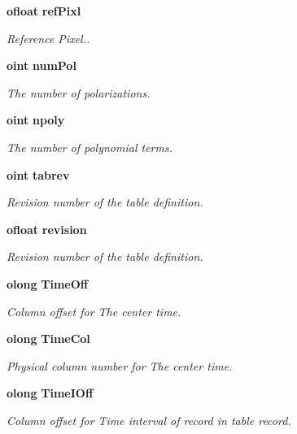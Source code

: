 \begin{CompactItemize}
{\bf ofloat} {\bf ref\-Pixl}
\begin{CompactList}\small\item\em Reference Pixel.. \item\end{CompactList}\item 
{\bf oint} {\bf num\-Pol}
\begin{CompactList}\small\item\em The number of polarizations. \item\end{CompactList}\item 
{\bf oint} {\bf npoly}
\begin{CompactList}\small\item\em The number of polynomial terms. \item\end{CompactList}\item 
{\bf oint} {\bf tabrev}
\begin{CompactList}\small\item\em Revision number of the table definition. \item\end{CompactList}\item 
{\bf ofloat} {\bf revision}
\begin{CompactList}\small\item\em Revision number of the table definition. \item\end{CompactList}\item 
{\bf olong} {\bf Time\-Off}
\begin{CompactList}\small\item\em Column offset for The center time. \item\end{CompactList}\item 
{\bf olong} {\bf Time\-Col}
\begin{CompactList}\small\item\em Physical column number for The center time. \item\end{CompactList}\item 
{\bf olong} {\bf Time\-IOff}
\begin{CompactList}\small\item\em Column offset for Time interval of record in table record. \item\end{CompactList}\item 

\end{CompactItemize}
